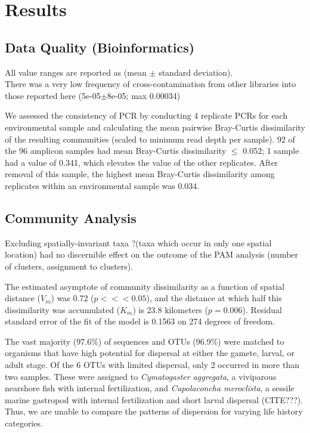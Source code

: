 \documentclass[11pt,letterpaper]{article} %
\begin{document}
\section*{Results}
\subsection*{Data Quality (Bioinformatics)}
All value ranges are reported as (mean $\pm$ standard deviation).\\
There was a very low frequency of cross-contamination from other libraries into those reported here (5e-05$\pm$8e-05; max 0.00034)

We assessed the consistency of PCR by conducting 4 replicate PCRs for each environmental sample and calculating the mean pairwise Bray-Curtis dissimilarity of the resulting communities (scaled to minimum read depth per sample).
92 of the 96 amplicon samples had mean Bray-Curtis dissimilarity $\leq$ 0.052; 1 sample had a value of 0.341, which elevates the value of the other replicates.
After removal of this sample, the highest mean Bray-Curtis dissimilarity among replicates within an environmental sample was 0.034.



\subsection*{Community Analysis}
Excluding spatially-invariant taxa ?(taxa which occur in only one spatial location) had no discernible effect on the outcome of the PAM analysis (number of clusters, assignment to clusters).

The estimated asymptote of community dissimilarity as a function of spatial distance ($V_m$) was 0.72 ($p <<< 0.05$), and the distance at which half this dissimilarity was accumulated ($K_m$) is 23.8 kilometers ($p = 0.006$).
Residual standard error of the fit of the model is 0.1563 on 274 degrees of freedom.

The vast majority (97.6\%) of sequences and OTUs (96.9\%) were matched to organisms that have high potential for dispersal at either the gamete, larval, or adult stage.
Of the 6 OTUs with limited dispersal, only 2 occurred in more than two samples.
These were assigned to \textit{Cymatogaster aggregata}, a viviparous nearshore fish with internal fertilization, and \textit{Cupolaconcha meroclista}, a sessile marine gastropod with internal fertilization and short larval dispersal (CITE???).
Thus, we are unable to compare the patterns of dispersion for varying life history categories.
\end{document}
